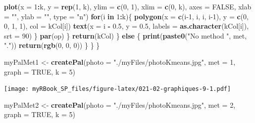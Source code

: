 \documentclass[
]{book}
\newenvironment{Shaded}{\begin{snugshade}}{\end{snugshade}}
\newcommand{\ControlFlowTok}[1]{\textcolor[rgb]{0.13,0.29,0.53}{\textbf{#1}}}
\newcommand{\DataTypeTok}[1]{\textcolor[rgb]{0.13,0.29,0.53}{#1}}
\newcommand{\DecValTok}[1]{\textcolor[rgb]{0.00,0.00,0.81}{#1}}
\newcommand{\FloatTok}[1]{\textcolor[rgb]{0.00,0.00,0.81}{#1}}
\newcommand{\KeywordTok}[1]{\textcolor[rgb]{0.13,0.29,0.53}{\textbf{#1}}}
\newcommand{\NormalTok}[1]{#1}
\newcommand{\OperatorTok}[1]{\textcolor[rgb]{0.81,0.36,0.00}{\textbf{#1}}}
\newcommand{\OtherTok}[1]{\textcolor[rgb]{0.56,0.35,0.01}{#1}}
\newcommand{\StringTok}[1]{\textcolor[rgb]{0.31,0.60,0.02}{#1}}
\begin{document}
\begin{Shaded}
\begin{Highlighting}[]
        \KeywordTok{plot}\NormalTok{(}\DataTypeTok{x =} \DecValTok{1}\OperatorTok{:}\NormalTok{k, }\DataTypeTok{y =} \KeywordTok{rep}\NormalTok{(}\DecValTok{1}\NormalTok{, k), }\DataTypeTok{ylim =} \KeywordTok{c}\NormalTok{(}\DecValTok{0}\NormalTok{, }\DecValTok{1}\NormalTok{), }
             \DataTypeTok{xlim =} \KeywordTok{c}\NormalTok{(}\DecValTok{0}\NormalTok{, k), }\DataTypeTok{axes =} \OtherTok{FALSE}\NormalTok{, }\DataTypeTok{xlab =} \StringTok{""}\NormalTok{, }
             \DataTypeTok{ylab =} \StringTok{""}\NormalTok{, }\DataTypeTok{type =} \StringTok{"n"}\NormalTok{)}
        \ControlFlowTok{for}\NormalTok{(i }\ControlFlowTok{in} \DecValTok{1}\OperatorTok{:}\NormalTok{k)\{}
          \KeywordTok{polygon}\NormalTok{(}\DataTypeTok{x =} \KeywordTok{c}\NormalTok{(i}\DecValTok{-1}\NormalTok{, i, i, i}\DecValTok{-1}\NormalTok{), }\DataTypeTok{y =} \KeywordTok{c}\NormalTok{(}\DecValTok{0}\NormalTok{, }\DecValTok{0}\NormalTok{, }\DecValTok{1}\NormalTok{, }\DecValTok{1}\NormalTok{), }
                  \DataTypeTok{col =}\NormalTok{ kCol[i])}
          \KeywordTok{text}\NormalTok{(}\DataTypeTok{x =}\NormalTok{ i }\OperatorTok{-}\StringTok{ }\FloatTok{0.5}\NormalTok{, }\DataTypeTok{y =} \FloatTok{0.5}\NormalTok{, }
               \DataTypeTok{labels =} \KeywordTok{as.character}\NormalTok{(kCol[i]), }\DataTypeTok{srt =} \DecValTok{90}\NormalTok{)}
\NormalTok{        \}}
        \KeywordTok{par}\NormalTok{(op)}
\NormalTok{      \}}
      \KeywordTok{return}\NormalTok{(kCol)}
\NormalTok{    \} }\ControlFlowTok{else}\NormalTok{ \{}
      \KeywordTok{print}\NormalTok{(}\KeywordTok{paste0}\NormalTok{(}\StringTok{"No method "}\NormalTok{, met, }\StringTok{"."}\NormalTok{))}
      \KeywordTok{return}\NormalTok{(}\KeywordTok{rgb}\NormalTok{(}\DecValTok{0}\NormalTok{, }\DecValTok{0}\NormalTok{, }\DecValTok{0}\NormalTok{))}
\NormalTok{    \}}
\NormalTok{  \}}
\NormalTok{\}}

\NormalTok{myPalMet1 <-}\StringTok{ }\KeywordTok{createPal}\NormalTok{(}\DataTypeTok{photo =} \StringTok{"./myFiles/photoKmeans.jpg"}\NormalTok{, }
                       \DataTypeTok{met =} \DecValTok{1}\NormalTok{, }\DataTypeTok{graph =} \OtherTok{TRUE}\NormalTok{, }\DataTypeTok{k =} \DecValTok{5}\NormalTok{)}
\end{Highlighting}
\end{Shaded}

\texttt{[image: myRBook\_SP\_files/figure-latex/021-02-graphiques-9-1.pdf]}

\begin{Shaded}
\begin{Highlighting}[]
\NormalTok{myPalMet2 <-}\StringTok{ }\KeywordTok{createPal}\NormalTok{(}\DataTypeTok{photo =} \StringTok{"./myFiles/photoKmeans.jpg"}\NormalTok{, }
                       \DataTypeTok{met =} \DecValTok{2}\NormalTok{, }\DataTypeTok{graph =} \OtherTok{TRUE}\NormalTok{, }\DataTypeTok{k =} \DecValTok{5}\NormalTok{)}
\end{Highlighting}
\end{Shaded}
\end{document}
